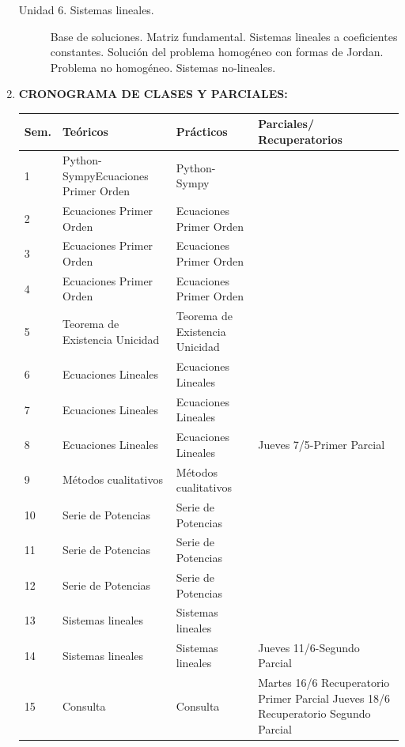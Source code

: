 \documentclass[12pt]{article}
\begin{document}
\begin{enumerate}
\begin{description}
\item[Unidad 6.  Sistemas lineales.]  Base de soluciones. Matriz fundamental. Sistemas lineales a coeficientes constantes. Solución del problema homogéneo con formas de Jordan. Problema no homogéneo. Sistemas no-lineales. \cite{ WilliamE.Boyce496,JorgeSotomayor513}

\end{description}

\item\textbf{CRONOGRAMA DE CLASES Y PARCIALES:}

\begin{table}[H]
\begin{tabular}{|m{0.6cm} |m{5cm}|m{5cm}|m{4.8cm}|}\hline
Sem.  & Teóricos & Prácticos & Parciales/ Recuperatorios\\\hline \hline
1   & Python-Sympy\newline Ecuaciones Primer Orden  &  Python-Sympy &   \\ \hline
  2 &  Ecuaciones Primer Orden  & Ecuaciones Primer Orden  &   \\ \hline
  3 &  Ecuaciones Primer Orden    &  Ecuaciones Primer Orden &   \\ \hline
   4 &  Ecuaciones Primer Orden    &  Ecuaciones Primer Orden &   \\ \hline
  5 & Teorema de Existencia Unicidad  &  Teorema de Existencia Unicidad   &   \\ \hline
  6 &   Ecuaciones Lineales   &  Ecuaciones Lineales   &   \\ \hline
  7 &  Ecuaciones Lineales   &  Ecuaciones Lineales &   \\ \hline

  8& Ecuaciones Lineales   &  Ecuaciones Lineales &  Jueves 7/5-Primer Parcial  \\ \hline

  9 & Métodos cualitativos & Métodos cualitativos   &   \\ \hline
  10 & Serie de Potencias  & Serie de Potencias  &   \\ \hline
  11 & Serie de Potencias   & Serie de Potencias  &   \\ \hline
   12 & Serie de Potencias   & Serie de Potencias  &   \\ \hline
  13 & Sistemas lineales  & Sistemas lineales  &   \\ \hline
  14 & Sistemas lineales & Sistemas lineales  &  Jueves 11/6-Segundo Parcial \\ \hline
  15  & Consulta & Consulta &  Martes 16/6 Recuperatorio Primer Parcial\newline
  Jueves 18/6 Recuperatorio Segundo Parcial \\ \hline

\end{tabular}
\end{table}

\end{enumerate}
















%
%
  
\end{document}
